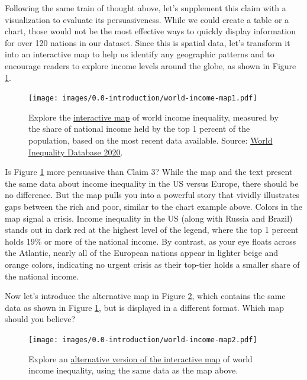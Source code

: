 \documentclass[
  english,
]{book}
\begin{document}
Following the same train of thought above, let's supplement this claim with a visualization to evaluate its persuasiveness. While we could create a table or a chart, those would not be the most effective ways to quickly display information for over 120 nations in our dataset. Since this is spatial data, let's transform it into an interactive map to help us identify any geographic patterns and to encourage readers to explore income levels around the globe, as shown in Figure \ref{fig:world-income-map1}.



\begin{figure}
\centering
\texttt{[image: images/0.0-introduction/world-income-map1.pdf]}
\caption{\label{fig:world-income-map1}Explore the \href{https://datawrapper.dwcdn.net/NLMLg/}{interactive map} of world income inequality, measured by the share of national income held by the top 1 percent of the population, based on the most recent data available. Source: \href{https://wid.world/world/\#sptinc_p99p100_z/US;FR;DE;CN;ZA;GB;WO/last/eu/k/p/yearly/s/false/5.070499999999999/30/curve/false/country}{World Inequality Database 2020}.}
\end{figure}

Is Figure \ref{fig:world-income-map1} more persuasive than Claim 3? While the map and the text present the same data about income inequality in the US versus Europe, there should be no difference. But the map pulls you into a powerful story that vividly illustrates gaps between the rich and poor, similar to the chart example above. Colors in the map signal a crisis. Income inequality in the US (along with Russia and Brazil) stands out in dark red at the highest level of the legend, where the top 1 percent holds 19\% or more of the national income. By contrast, as your eye floats across the Atlantic, nearly all of the European nations appear in lighter beige and orange colors, indicating no urgent crisis as their top-tier holds a smaller share of the national income.

Now let's introduce the alternative map in Figure \ref{fig:world-income-map2}, which contains the same data as shown in Figure \ref{fig:world-income-map1}, but is displayed in a different format. Which map should you believe?



\begin{figure}
\centering
\texttt{[image: images/0.0-introduction/world-income-map2.pdf]}
\caption{\label{fig:world-income-map2}Explore an \href{https://datawrapper.dwcdn.net/o5f9Q/}{alternative version of the interactive map} of world income inequality, using the same data as the map above.}
\end{figure}
\end{document}
